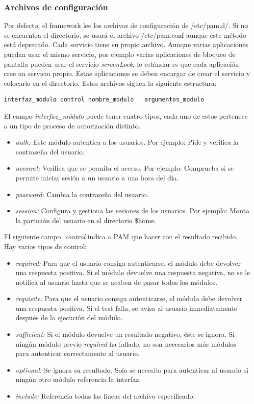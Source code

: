 \documentclass[twoside, titlepage, 12pt, a4paper]{article}
\begin{document}
\subsubsection{Archivos de configuración}
Por defecto, el framework lee los archivos de configuración de /etc/pam.d/. Si no se encuentra el directorio, se usará el archivo /etc/pam.conf aunque este método está deprecado. Cada servicio tiene su propio archivo. Aunque varias aplicaciones puedan usar el mismo servicio, por ejemplo varias aplicaciones de bloqueo de pantalla pueden usar el servicio \textit{screenLock}, lo estándar es que cada aplicación cree un servicio propio. Estas aplicaciones se deben encargar de crear el servicio y colocarlo en el directorio.
Estos archivos siguen la siguiente estructura:
\begin{lstlisting}
interfaz_modulo	control	nombre_modulo	argumentos_modulo
\end{lstlisting} \par
El campo \textit{interfaz\_módulo} puede tener cuatro tipos, cada uno de estos pertenece a un tipo de proceso de autorización distinto.
\begin{itemize}
	\item{\textit{auth: }}Este módulo autentica a los usuarios. Por ejemplo: Pide y verifica la contraseña del usuario.
	\item{\textit{account: }}Verifica que se permita el acceso. Por ejemplo: Comprueba si se permite iniciar sesión a un usuario a una hora del día.
	\item{\textit{password: }}Cambia la contraseña del usuario.
	\item{\textit{session: }}Configura y gestiona las sesiones de los usuarios. Por ejemplo: Monta la partición del usuario en el directorio \$home.
\end{itemize} \par
El siguiente campo, \textit{control} indica a PAM que hacer con el resultado recibido. Hay varios tipos de control:
\begin{itemize}
	\item{\textit{required: }}Para que el usuario consiga autenticarse, el módulo debe devolver una respuesta positiva. Si el módulo devuelve una respuesta negativa, no se le notifica al usuario hasta que se acaben de pasar todos los módulos.
	\item{\textit{requisite: }}Para que el usuario consiga autenticarse, el módulo debe devolver una respuesta positiva. Si el test falla, se avisa al usuario inmediatamente después de la ejecución del módulo.
	\item{\textit{sufficient: }}Si el módulo devuelve un resultado negativo, éste se ignora. Si ningún módulo previo \textit{required} ha fallado, no son necesarios más módulos para autenticar correctamente al usuario.
	\item{\textit{optional: }}Se ignora su resultado. Solo se necesita para autenticar al usuario si ningún otro módulo referencia la interfaz.
	\item{\textit{include: }}Referencia todas las líneas del archivo especificado.
\end{itemize} \par
\end{document}
